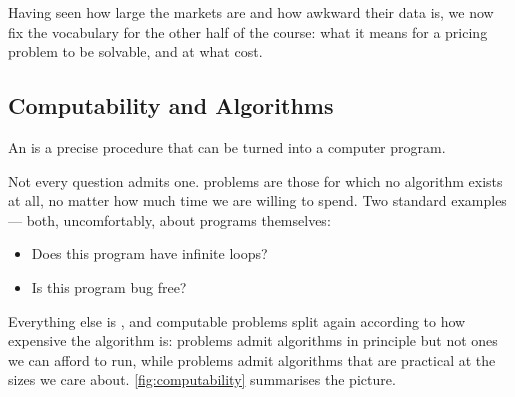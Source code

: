 \bigskip

\noindent Having seen how large the markets are and how awkward their data is, we now fix the vocabulary for the other half of the course: what it means for a pricing problem to be solvable, and at what cost.

\subsection{Computability and Algorithms}


\begin{definition}
	An  is a precise procedure that can be turned into a computer program.
\end{definition}

Not every question admits one.
 problems are those for which no algorithm exists at all, no matter how much time we are willing to spend.
Two standard examples --- both, uncomfortably, about programs themselves:

\begin{itemize}[nosep]
	\item Does this program have infinite loops?
	\item Is this program bug free?
\end{itemize}

Everything else is , and computable problems split again according to how expensive the algorithm is:  problems admit algorithms in principle but not ones we can afford to run, while  problems admit algorithms that are practical at the sizes we care about.
\autoref{fig:computability} summarises the picture.

